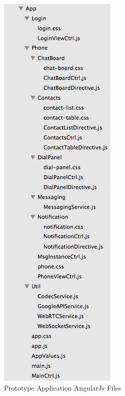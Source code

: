 \begin{appendices}
\begin{figure}
	\centering
    	\includegraphics[height=0.45\textheight,natwidth=610,natheight=642]{figs/angularjs_structure.png}
  	\caption{Prototype Application AngularJs Files}
  	\label{fig:angularjs_structure}
\end{figure}

\end{appendices}
